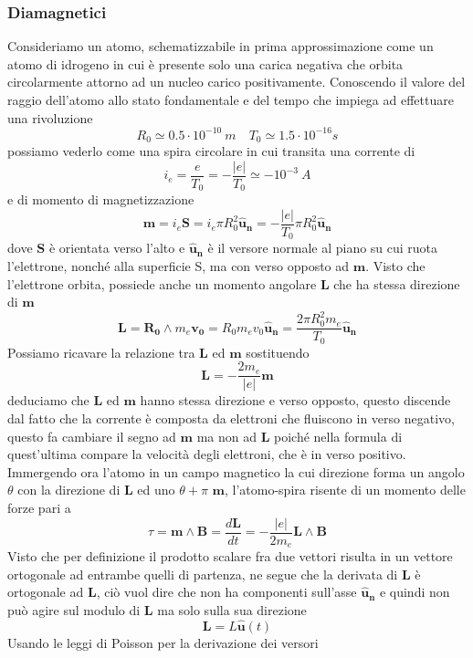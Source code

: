 \documentclass[
10pt, %
a4paper, %
oneside, %
headinclude,footinclude, %
BCOR5mm, %
]{scrartcl}
\begin{document}
\subsubsection{Diamagnetici}
Consideriamo un atomo, schematizzabile in prima approssimazione come un atomo di idrogeno in cui è presente solo una carica negativa che orbita circolarmente attorno ad un nucleo carico positivamente. Conoscendo il valore del raggio dell'atomo allo stato fondamentale e del tempo che impiega ad effettuare una rivoluzione
\[R_0 \simeq 0.5\cdot 10^{-10}\ m \quad T_0 \simeq 1.5\cdot 10^{-16}s\]
possiamo vederlo come una spira circolare in cui transita una corrente di
\[i_e = \frac{e}{T_0} = -\frac{|e|}{T_0} \simeq -10^{-3}\ A\]
e di momento di magnetizzazione
\[\mathbf{m} = i_e \mathbf{S} = i_e \pi R_0^2\mathbf{\hat{u}_n} = -\frac{|e|}{T_0}\pi R_0^2 \mathbf{\hat{u}_n}\]
dove \(\mathbf{S}\) è orientata verso l'alto e \(\mathbf{\hat{u}_n}\) è il versore normale al piano su cui ruota l'elettrone, nonché alla superficie S, ma con verso opposto ad \(\mathbf{m}\). Visto che l'elettrone orbita, possiede anche un momento angolare \(\mathbf{L}\) che ha stessa direzione di \(\mathbf{m}\)
\[\mathbf{L} = \mathbf{R_0}\wedge m_e\mathbf{v_0} = R_0 m_e v_0 \mathbf{\hat{u}_n} = \frac{2\pi R_0^2 m_e}{T_0}\mathbf{\hat{u}_n} \]
Possiamo ricavare la relazione tra \(\mathbf{L}\) ed \(\mathbf{m}\) sostituendo
\[\mathbf{L} = -\frac{2 m_e}{|e|}\mathbf{m}\]
deduciamo che \(\mathbf{L}\) ed \(\mathbf{m}\) hanno stessa direzione e verso opposto, questo discende dal fatto che la corrente è composta da elettroni che fluiscono in verso negativo, questo fa cambiare il segno ad \(\mathbf{m}\) ma non ad \(\mathbf{L}\) poiché nella formula di quest'ultima compare la velocità degli elettroni, che è in verso positivo.\\
Immergendo ora l'atomo in un campo magnetico la cui direzione forma un angolo $\theta$ con la direzione di \(\mathbf{L}\) ed uno \(\theta + \pi\) \(\mathbf{m}\), l'atomo-spira risente di un momento delle forze pari a 
\[\tau = \mathbf{m}\wedge \mathbf{B} = \frac{d\mathbf{L}}{dt} = -\frac{|e|}{2m_e} \mathbf{L}\wedge \mathbf{B}\]
Visto che per definizione il prodotto scalare fra due vettori risulta in un vettore ortogonale ad entrambe quelli di partenza, ne segue che la derivata di \(\mathbf{L}\) è ortogonale ad \(\mathbf{L}\), ciò vuol dire che non ha componenti sull'asse \(\mathbf{\hat{u}_n}\) e quindi non può agire sul modulo di \(\mathbf{L}\) ma solo sulla sua direzione
\[\mathbf{L} = L \mathbf{\hat{u}}(t)\]
Usando le leggi di Poisson per la derivazione dei versori
\end{document}
